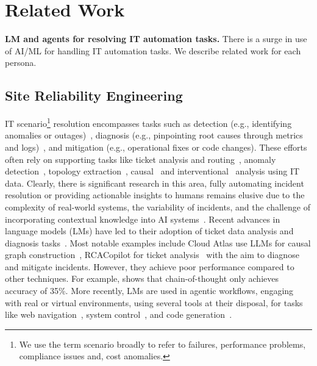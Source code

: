 \section{Related Work}
\textbf{LM and agents for resolving IT automation tasks.}
There is a surge in use of AI/ML for handling IT automation tasks.
We describe related work for each persona.

\subsection{Site Reliability Engineering}
IT scenario\footnote{We use the term scenario broadly to refer to failures, performance problems, compliance issues and, cost anomalies.} resolution encompasses tasks such as detection (e.g., identifying anomalies or outages)~\cite{10.1145/2829988.2787496, leners2011detecting, sigelman2010dapper, fonseca2007x}, diagnosis (e.g., pinpointing root causes through metrics and logs)~\cite{tan2019netbouncer,jha2020live, ma2014node, PyRCA}, and mitigation (e.g., operational fixes or code changes). 
These efforts often rely on supporting tasks like ticket analysis and routing~\cite{gao2020scouts,liu2023ticket, arzani2016taking}, anomaly detection~\cite{TSBench}, topology extraction~\cite{ashok2024traceweaver, chakraborty2023causil, pham2024root, yao2024chain}, causal~\cite{budhathoki2022causal, dowhy, ikram2022root, chakraborty2023causil} and interventional~\cite{wang2023fault, bagehorn2022fault} analysis using IT data.
Clearly, there is significant research in this area, fully automating incident resolution or providing actionable insights to humans remains elusive due to the complexity of real-world systems, the variability of incidents, and the challenge of incorporating contextual knowledge into AI systems~\cite{jha2020live}. 
Recent advances in language models (LMs) have led to their adoption of ticket data analysis and diagnosis tasks~\cite{roy2024exploringllmbasedagentsroot, 10172904,cloudatlas, chen2023empowering, rcaflash}. 
Most notable examples include Cloud Atlas use LLMs for causal graph construction~\cite{cloudatlas}, RCACopilot for ticket analysis~\cite{chen2023empowering} with the aim to diagnose and mitigate incidents.
However, they achieve poor performance compared to other techniques. For example, \cite{roy2024exploringllmbasedagentsroot} shows that chain-of-thought only achieves accuracy of 35\%. 
More recently, LMs are used in agentic workflows, engaging with real or virtual environments, using several tools at their disposal, for tasks like web navigation~\cite{workarena2024, workarena++, koh2024visualwebarena}, system control~\cite{sahu2024insightbench, rcaflash, aiopslab}, and code generation~\cite{yang2024swe}. 
